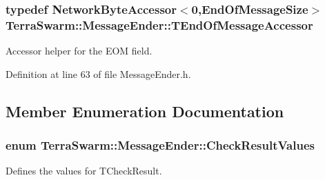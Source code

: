 \hypertarget{class_terra_swarm_1_1_message_ender_aa82232ef2e15f3c918e5d8187dff86f8}{
\subsubsection[{T\-End\-Of\-Message\-Accessor}]{\setlength{\rightskip}{0pt plus 5cm}typedef {\bf Network\-Byte\-Accessor}$<$0,{\bf End\-Of\-Message\-Size}$>$ {\bf Terra\-Swarm\-::\-Message\-Ender\-::\-T\-End\-Of\-Message\-Accessor}\hspace{0.3cm}{\ttfamily [private]}}}\label{class_terra_swarm_1_1_message_ender_aa82232ef2e15f3c918e5d8187dff86f8}


Accessor helper for the E\-O\-M field. 



Definition at line 63 of file Message\-Ender.\-h.



\subsection{Member Enumeration Documentation}
\hypertarget{class_terra_swarm_1_1_message_ender_ad7afbe0b4913ddd8eebac745d343e1cd}{
\subsubsection[{Check\-Result\-Values}]{\setlength{\rightskip}{0pt plus 5cm}enum {\bf Terra\-Swarm\-::\-Message\-Ender\-::\-Check\-Result\-Values}}}\label{class_terra_swarm_1_1_message_ender_ad7afbe0b4913ddd8eebac745d343e1cd}


Defines the values for T\-Check\-Result. 

